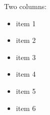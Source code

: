 \documentclass[varwidth, border={5pt 5pt 5pt 5pt}]{standalone}
\begin{document}
Two columns:
\begin{multicols}{2}
\begin{itemize}
\item item 1
\item item 2
\item item 3
\item item 4
\item item 5
\item item 6
\end{itemize}
\end{multicols}
\end{document}
